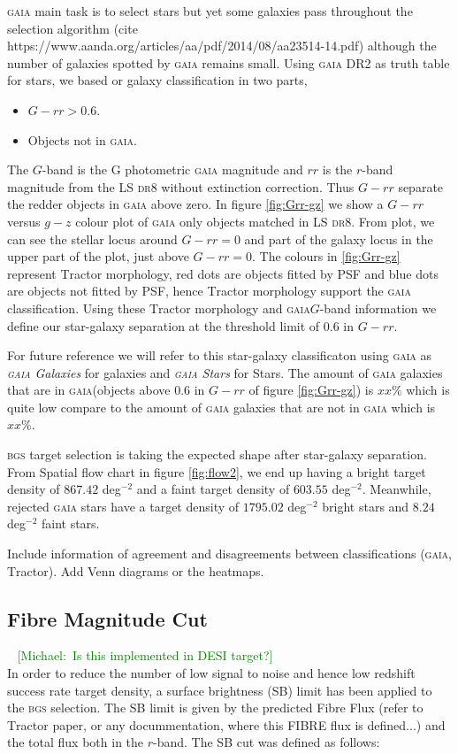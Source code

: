 \documentclass[fleqn,usenatbib]{mnras}
\newcommand{\mike}[1]{~\newline\noindent \textcolor{Green}{{ [Michael:~{#1}]\\}}}
\newcommand{\BGS}{\textsc{bgs}\xspace}
\newcommand{\DReight}{\textsc{dr8}\xspace}
\newcommand{\GAIA}{\textsc{gaia}\xspace}
\newcommand{\TRACTOR}{\textsc{T}ractor\xspace}
\begin{document}
\GAIA main task is to select stars but yet some galaxies pass throughout the selection algorithm (cite https://www.aanda.org/articles/aa/pdf/2014/08/aa23514-14.pdf) although the number of galaxies spotted by \GAIA remains small. Using \GAIA DR2 as truth table for stars, we based or galaxy classification in two parts,

\begin{itemize}
    \item $G-rr > 0.6$.
    \item Objects not in \GAIA.
\end{itemize}

The $G$-band is the G photometric \GAIA magnitude and $rr$ is the $r$-band magnitude from the LS \DReight without extinction correction. Thus $G-rr$ separate the redder objects in \GAIA above zero. In figure \ref{fig:Grr-gz} we show a $G-rr$ versus $g-z$ colour plot of \GAIA only objects matched in LS \DReight. From plot, we can see the stellar locus around $G-rr=0$ and part of the galaxy locus in the upper part of the plot, just above $G-rr=0$. The colours in \ref{fig:Grr-gz} represent \TRACTOR morphology, red dots are objects fitted by PSF and blue dots are objects not fitted by PSF, hence \TRACTOR morphology support the \GAIA classification. Using these \TRACTOR morphology and \GAIA $G$-band information we define our star-galaxy separation at the threshold limit of $0.6$ in $G-rr$. 

For future reference we will refer to this star-galaxy classificaton using \GAIA as {\it \GAIA Galaxies} for galaxies and {\it \GAIA Stars} for Stars. The amount of \GAIA galaxies that are in \GAIA (objects above $0.6$ in $G-rr$ of figure \ref{fig:Grr-gz}) is $xx \%$ which is quite low compare to the amount of \GAIA galaxies that are not in \GAIA which is $xx \%$. 

\BGS target selection is taking the expected shape after star-galaxy separation. From Spatial flow chart in figure \ref{fig:flow2}, we end up having a bright target density of $867.42$ deg$^{-2}$ and a faint target density of $603.55$ deg$^{-2}$. Meanwhile, rejected \GAIA stars have a target density of $1795.02$ deg$^{-2}$ bright stars and $8.24$ deg$^{-2}$ faint stars.

Include information of agreement and disagreements between classifications (\GAIA, \TRACTOR). Add Venn diagrams or the heatmaps.

\subsection{Fibre Magnitude Cut}
\mike{Is this implemented in DESI target?}
In order to reduce the number of low signal to noise and hence low redshift success rate target density, a surface brightness (SB) limit has been applied to the \BGS selection. The SB limit is given by the predicted Fibre Flux (refer to \TRACTOR paper, or any docummentation, where this FIBRE flux is defined...) and the total flux both in the $r$-band. The SB cut was defined as follows:
\end{document}
